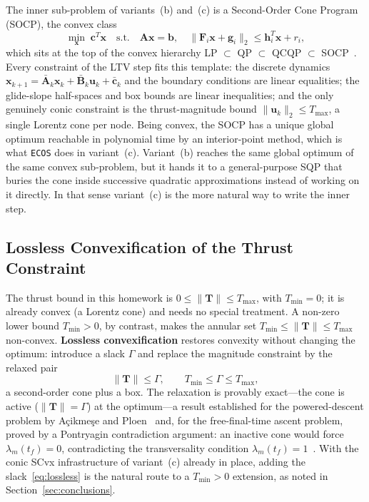 \documentclass[../main.tex]{subfiles}
\begin{document}
The inner sub-problem of variants~(b) and~(c) is a Second-Order Cone Program (SOCP), the convex class
\begin{equation}
    \min_{\mathbf{x}}\; \mathbf{c}^T\mathbf{x}
    \quad\text{s.t.}\quad \mathbf{A}\mathbf{x} = \mathbf{b},\quad
    \|\mathbf{F}_i\mathbf{x} + \mathbf{g}_i\|_2 \leq \mathbf{h}_i^T\mathbf{x} + r_i,
    \label{eq:socp}
\end{equation}
which sits at the top of the convex hierarchy LP $\subset$ QP $\subset$ QCQP $\subset$ SOCP~\cite[Sec.~4.4.2]{boyd2004}. Every constraint of the LTV step fits this template: the discrete dynamics $\mathbf{x}_{k+1} = \bar{\mathbf{A}}_k\mathbf{x}_k + \bar{\mathbf{B}}_k\mathbf{u}_k + \bar{\mathbf{c}}_k$ and the boundary conditions are linear equalities; the glide-slope half-spaces and box bounds are linear inequalities; and the only genuinely conic constraint is the thrust-magnitude bound $\|\mathbf{u}_k\|_2 \leq T_{\max}$, a single Lorentz cone per node. Being convex, the SOCP has a unique global optimum reachable in polynomial time by an interior-point method, which is what \texttt{ECOS} does in variant~(c). Variant~(b) reaches the same global optimum of the same convex sub-problem, but it hands it to a general-purpose SQP that buries the cone inside successive quadratic approximations instead of working on it directly. In that sense variant~(c) is the more natural way to write the inner step.

\subsection{Lossless Convexification of the Thrust Constraint}\label{sec:lossless}

The thrust bound in this homework is $0 \leq \|\mathbf{T}\| \leq T_{\max}$, with $T_{\min} = 0$; it is already convex (a Lorentz cone) and needs no special treatment. A non-zero lower bound $T_{\min} > 0$, by contrast, makes the annular set $T_{\min} \leq \|\mathbf{T}\| \leq T_{\max}$ non-convex. \textbf{Lossless convexification} restores convexity without changing the optimum: introduce a slack $\Gamma$ and replace the magnitude constraint by the relaxed pair
\begin{equation}
    \|\mathbf{T}\| \leq \Gamma, \qquad T_{\min} \leq \Gamma \leq T_{\max},
    \label{eq:lossless}
\end{equation}
a second-order cone plus a box. The relaxation is provably exact---the cone is active ($\|\mathbf{T}\| = \Gamma$) at the optimum---a result established for the powered-descent problem by A\c{c}ikme\c{s}e and Ploen~\cite{acikmese2007} and, for the free-final-time ascent problem, proved by a Pontryagin contradiction argument: an inactive cone would force $\lambda_m(t_f) = 0$, contradicting the transversality condition $\lambda_m(t_f) = 1$~\cite[Prop.~1 and App.~B]{benedikter2022}. With the conic SCvx infrastructure of variant~(c) already in place, adding the slack~\eqref{eq:lossless} is the natural route to a $T_{\min} > 0$ extension, as noted in Section~\ref{sec:conclusions}.
\end{document}
